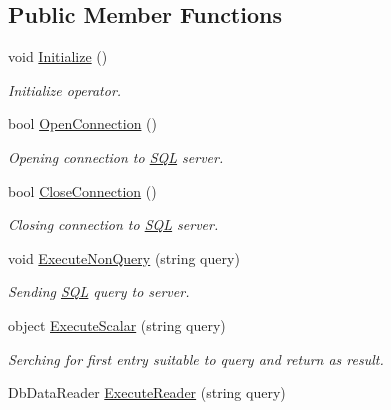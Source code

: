 \subsection*{Public Member Functions}
\begin{DoxyCompactItemize}
\item 
void \mbox{\hyperlink{interface_uniform_data_operator_1_1_s_q_l_1_1_i_s_q_l_operator_a653f3722befbd300e9ae8ae6f363790f}{Initialize}} ()
\begin{DoxyCompactList}\small\item\em Initialize operator. \end{DoxyCompactList}\item 
bool \mbox{\hyperlink{interface_uniform_data_operator_1_1_s_q_l_1_1_i_s_q_l_operator_aca1b52435a858e57db8d762026ceef2e}{Open\+Connection}} ()
\begin{DoxyCompactList}\small\item\em Opening connection to \mbox{\hyperlink{namespace_uniform_data_operator_1_1_s_q_l}{S\+QL}} server. \end{DoxyCompactList}\item 
bool \mbox{\hyperlink{interface_uniform_data_operator_1_1_s_q_l_1_1_i_s_q_l_operator_a4d13aeb36ebbe0f08eedf48777b048a3}{Close\+Connection}} ()
\begin{DoxyCompactList}\small\item\em Closing connection to \mbox{\hyperlink{namespace_uniform_data_operator_1_1_s_q_l}{S\+QL}} server. \end{DoxyCompactList}\item 
void \mbox{\hyperlink{interface_uniform_data_operator_1_1_s_q_l_1_1_i_s_q_l_operator_a15108adeb878698e82104e374ac37ef2}{Execute\+Non\+Query}} (string query)
\begin{DoxyCompactList}\small\item\em Sending \mbox{\hyperlink{namespace_uniform_data_operator_1_1_s_q_l}{S\+QL}} query to server. \end{DoxyCompactList}\item 
object \mbox{\hyperlink{interface_uniform_data_operator_1_1_s_q_l_1_1_i_s_q_l_operator_a8a39200efe4781edee40151982940f75}{Execute\+Scalar}} (string query)
\begin{DoxyCompactList}\small\item\em Serching for first entry suitable to query and return as result. \end{DoxyCompactList}\item 
Db\+Data\+Reader \mbox{\hyperlink{interface_uniform_data_operator_1_1_s_q_l_1_1_i_s_q_l_operator_a1f6dfa5dd14f7d52559b4e8f1ffda52e}{Execute\+Reader}} (string query)

\end{DoxyCompactItemize}
